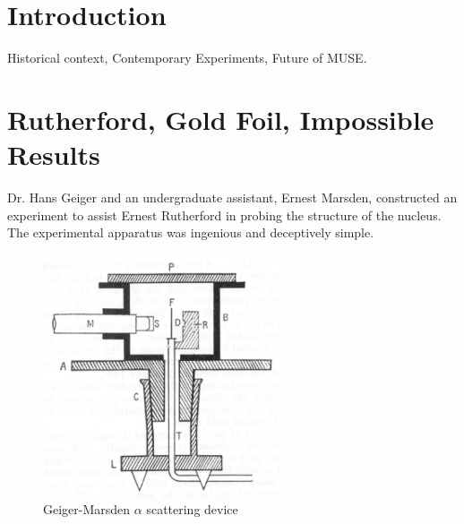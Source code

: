 \documentclass[12pt]{article}
\begin{document}
\maketitle


\section{Introduction}
Historical context, Contemporary Experiments, Future of MUSE.

\section{Rutherford, Gold Foil, Impossible Results}

Dr. Hans Geiger and an undergraduate assistant, Ernest Marsden, constructed an experiment to assist Ernest Rutherford in probing the structure of the nucleus.
The experimental apparatus was ingenious and deceptively simple.

\begin{figure}[h]
    \centering
    \includegraphics[width=7cm]{gold_foil_device}
    \caption{Geiger-Marsden $\alpha$ scattering device\cite{Geiger1913}}
    \label{fig:device}
\end{figure}
\end{document}
